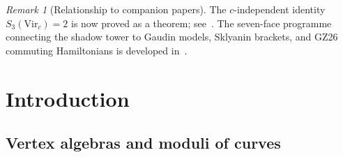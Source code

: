 \documentclass[11pt]{article}
\theoremstyle{plain}
\theoremstyle{definition}
\theoremstyle{remark}
\newtheorem{remark}[theorem]{Remark}
\newcommand{\cW}{\mathcal{W}}
\begin{document}
\begin{abstract}
For a chirally Koszul vertex algebra~$A$ with modular
characteristic~$\kappa$, cubic shadow~$\alpha$, and quartic
shadow~$S_4$, we prove that the infinite sequence of higher
deformation invariants $\{S_r\}_{r \geq 2}$ extracted from the
bar construction is algebraic of degree~$2$:\ the weighted
generating function $H(t) = \sum_{r \geq 2} r\,S_r\,t^r$
satisfies $H(t)^2 = t^4\,Q(t)$, where
\[
 Q(t) \;=\; 4\kappa^2 + 12\kappa\alpha\,t
 + (9\alpha^2 + 16\kappa S_4)\,t^2
\]
is the \emph{shadow metric}, a quadratic polynomial determined
by the genus-$0$ OPE data of~$A$.
The critical discriminant $\Delta = 8\kappa S_4$ partitions all
chirally Koszul algebras into four classes:
Gaussian ($\Delta = 0$, $\alpha = 0$; depth~$2$),
Lie ($\Delta = 0$, $\alpha \neq 0$; depth~$3$),
contact (depth~$4$, by stratum separation), and
mixed ($\Delta \neq 0$; depth~$\infty$).
The entire infinite tail $\{S_r\}_{r \geq 5}$ is determined by the
three invariants $(\kappa, \alpha, S_4)$.
We compute shadow obstruction towers explicitly for all standard families
(Heisenberg, affine Kac--Moody, $\beta\gamma$, Virasoro,
$\cW_N$), derive the shadow connection and its Koszul
monodromy~$-1$, and extract the genus-$2$ cross-channel
correction $\delta F_2(\cW_3) = (c+204)/(16c)$
(the multi-generator universality problem is resolved
negatively: this correction is nonvanishing; see
Remark~\ref{rem:cross-channel-status}) by a
graph-by-graph stable graph sum over the seven genus-$2$ stable
graphs.
\end{abstract}

\begin{remark}[Relationship to companion papers]
The $c$-independent identity $S_3(\mathrm{Vir}_c) = 2$ is now proved
as a theorem; see~\cite{LorgatVirR}. The seven-face
programme connecting the shadow tower to Gaudin models, Sklyanin
brackets, and GZ26 commuting Hamiltonians is developed
in~\cite{LorgatSevenFaces}.
\end{remark}


\section{Introduction}\label{sec:intro}

\subsection{Vertex algebras and moduli of curves}
\end{document}
